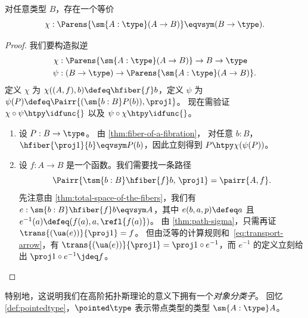 \begin{thm}\label{thm:nobject-classifier-appetizer}
对任意类型 $B$，存在一个等价
\begin{equation*}
\chi:\Parens{\sm{A:\type} (A\to B)}\eqvsym (B\to\type).
\end{equation*}
\end{thm}
\begin{proof}
我们要构造拟逆
\begin{align*}
\chi & : \Parens{\sm{A:\type} (A\to B)}\to B\to\type\\
\psi & : (B\to\type)\to\Parens{\sm{A:\type} (A\to B)}.
\end{align*}
定义 $\chi$ 为 $\chi((A,f),b)\defeq\hfiber{f}b$，定义 $\psi$ 为 $\psi(P)\defeq\Pairr{(\sm{b:B} P(b)),\proj1}$。
现在需验证 $\chi\circ\psi\htpy\idfunc{}$ 以及 $\psi\circ\chi \htpy\idfunc{}$。
\begin{enumerate}
\item 设 $P:B\to\type$。
  由 \cref{thm:fiber-of-a-fibration}，
对任意 $b:B$，$\hfiber{\proj1}{b}\eqvsym P(b)$，因此立刻得到
$P\htpy\chi(\psi(P))$。
\item 设 $f:A\to B$ 是一个函数。我们需要找一条路径
\begin{equation*}
\Pairr{\tsm{b:B} \hfiber{f}b,\,\proj1}=\pairr{A,f}.
\end{equation*}
先注意由 \cref{thm:total-space-of-the-fibers}，我们有
$e:\sm{b:B} \hfiber{f}b\eqvsym A$，其中 $e(b,a,p)\defeq a$ 且 $e^{-1}(a)
\defeq(f(a),a,\refl{f(a)})$。
由 \cref{thm:path-sigma}，只需再证 $\trans{(\ua(e))}{\proj1} = f$。
但由泛等的计算规则和~\eqref{eq:transport-arrow}，有 $\trans{(\ua(e))}{\proj1} = \proj1\circ e^{-1}$，而 $e^{-1}$ 的定义立刻给出 $\proj1 \circ e^{-1} \jdeq f$。\qedhere
\end{enumerate}
\end{proof}

\noindent
{}%
%
%
特别地，这说明我们在高阶拓扑斯理论的意义下拥有一个\emph{对象分类子}。
回忆 \cref{def:pointedtype}，$\pointed\type$ 表示带点类型的类型 $\sm{A:\type} A$。

